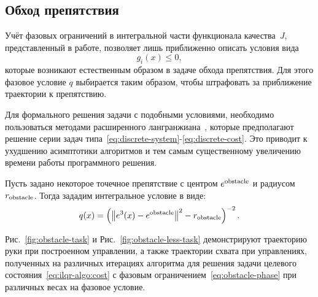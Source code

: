 \documentclass[../../doc.tex]{subfiles}
\begin{document}
    \subsection{Обход препятствия}
    
    Учёт фазовых ограничений в интегральной части функционала качест\-ва~$J$, представленный в работе,
    позволяет лишь приближенно описать условия вида
    $$
        g_i(x) \leqslant 0,
    $$
    которые возникают естественным образом в задаче обхода препятствия.
    Для этого фазовое условие $q$ выбирается таким образом, чтобы штрафовать за приближение траектории к препятствию.

    \begin{remark}
        Для формального решения задачи с подобными условиями,
        необходимо пользоваться методами расширенного лангранжиана~\cite{birgin2009},
        которые предполагают решение серии задач типа~\eqref{eq:discrete-system}-\eqref{eq:discrete-cost}.
        Это приводит к ухудшению асимптотики алгоритмов и тем самым существенному увеличению времени работы программного решения.
    \end{remark}

    Пусть задано некоторое точечное препятствие с центром $e^{\textnormal{obstacle}}$ и радиусом $r_{\textnormal{obstacle}}$.
    Тогда зададим интегральное условие в виде:
    \begin{equation}\label{eq:obstacle-phase}
        q(x) = \left( \left\| e^3(x) - e^{\textnormal{obstacle}} \right\|^2 - r_{\textnormal{obstacle}} \right)^{-2}.
    \end{equation}

    Рис.~\ref{fig:obstacle-task} и Рис.~\ref{fig:obstacle-less-task} демонстрируют траекторию руки при построенном управлении, а также траектории схвата при управлениях, полученных на различных итерациях алгоритма
    для решения задачи целевого состояния~\eqref{eq:ilqr-algo:cost} с фазовым ограничением~\eqref{eq:obstacle-phase} при различных весах на фазовое условие.
\end{document}
